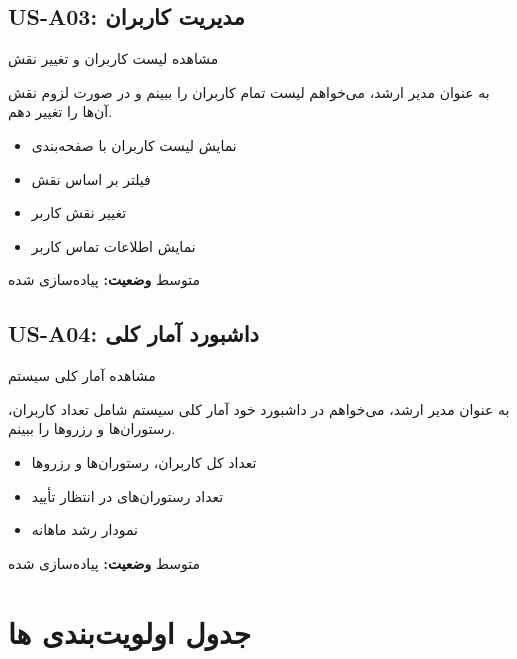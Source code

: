 \documentclass[12pt, a4paper]{article}
\begin{document}
\subsection{US-A03: مدیریت کاربران}
\begin{description}[rightmargin=0.5cm]
  \item[عنوان:] مشاهده لیست کاربران و تغییر نقش
  \item[داستان:] به عنوان مدیر ارشد، می‌خواهم لیست تمام کاربران را ببینم و در صورت لزوم
  نقش آن‌ها را تغییر دهم.
  \item[معیارهای پذیرش:]
  \begin{itemize}[rightmargin=0.5cm]
    \item نمایش لیست کاربران با صفحه‌بندی
    \item فیلتر بر اساس نقش
    \item تغییر نقش کاربر
    \item نمایش اطلاعات تماس کاربر
  \end{itemize}
  \item[اولویت:] متوسط \quad \textbf{وضعیت:} پیاده‌سازی شده
\end{description}

\subsection{US-A04: داشبورد آمار کلی}
\begin{description}[rightmargin=0.5cm]
  \item[عنوان:] مشاهده آمار کلی سیستم
  \item[داستان:] به عنوان مدیر ارشد، می‌خواهم در داشبورد خود آمار کلی سیستم شامل
  تعداد کاربران، رستوران‌ها و رزروها را ببینم.
  \item[معیارهای پذیرش:]
  \begin{itemize}[rightmargin=0.5cm]
    \item تعداد کل کاربران، رستوران‌ها و رزروها
    \item تعداد رستوران‌های در انتظار تأیید
    \item نمودار رشد ماهانه
  \end{itemize}
  \item[اولویت:] متوسط \quad \textbf{وضعیت:} پیاده‌سازی شده
\end{description}

\newpage

\section{جدول اولویت‌بندی ها}
\end{document}
